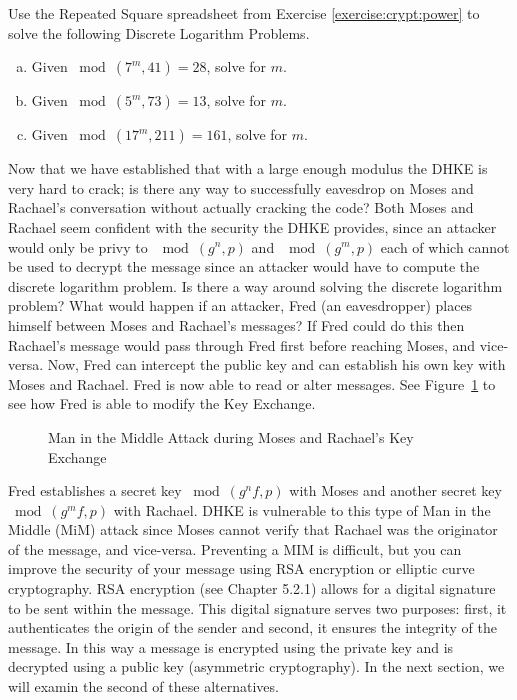 \begin{exer}
Use the Repeated Square spreadsheet from Exercise \ref{exercise:crypt:power} to solve the following Discrete Logarithm Problems.  
\begin{enumerate}[(a)]
\item Given $ \bmod(7^{m}, 41)=28$, solve for $m$.

\item Given $ \bmod(5^{m}, 73)=13$, solve for $m$.

\item Given $ \bmod(17^{m}, 211)=161$, solve for $m$.
\end{enumerate}
\end{exer}
Now that we have established that with a large enough modulus the DHKE is very hard to crack; is there any way to successfully eavesdrop on Moses and Rachael's conversation without actually cracking the code?  Both Moses and Rachael seem confident with the security the DHKE provides, since an attacker would only be privy to $\mod (g^n , p)$ and $\mod (g^m , p)$ each of which cannot be used to decrypt the message since an attacker would have to compute the discrete logarithm problem. Is there a way around solving the discrete logarithm problem?  What would happen if an attacker, Fred (an eavesdropper) places himself between Moses and Rachael's messages?  If Fred could do this then Rachael's message would pass through Fred first before reaching Moses, and vice-versa. Now, Fred can intercept the public key and can establish his own key with Moses and Rachael.  Fred is now able to read or alter messages.  See Figure~\ref{fig:DH:DHKE_2} to see how Fred is able to modify the Key Exchange.
\begin{figure}[H]
	  \caption{\label{fig:DH:DHKE_2} Man in the Middle Attack during Moses and Rachael's Key Exchange }
\end{figure}

Fred establishes a secret key $\bmod ( g^nf, p)$ with Moses and another secret key $\bmod ( g^mf, p)$ with Rachael.  DHKE is vulnerable to this type of Man in the Middle (MiM) attack since Moses cannot verify that Rachael was the originator of the message, and vice-versa.  Preventing a MIM is difficult, but you can improve the security of your message using RSA encryption or elliptic curve cryptography. RSA encryption (see Chapter 5.2.1) allows for a digital signature to be sent within the message. This digital signature serves two purposes: first, it authenticates the origin of the sender and second, it ensures the integrity of the message. In this way a message is encrypted using the private key and is decrypted using a public key (asymmetric cryptography). In the next section, we will examin the second of these alternatives. 

